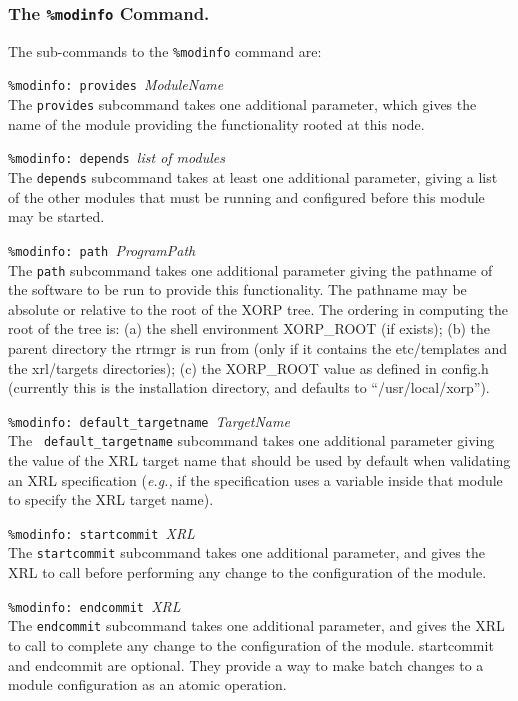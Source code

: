\documentclass[11pt]{article}
\newcommand{\eg}{\emph{e.g.,}\xspace}
\begin{document}
\subsubsection{The {\tt \%modinfo} Command.}
The sub-commands to the {\tt \%modinfo} command are:
\begin{description}
\item {{\tt \%modinfo: provides }{\it ModuleName}}  \\The {\tt provides} subcommand takes one additional
parameter, which gives the name of the module providing the
functionality rooted at this node.  

\item {{\tt \%modinfo: depends }{\it list of modules}}  \\The {\tt depends} subcommand takes at least one additional
parameter, giving a list of the other modules that must
be running and configured before this module may be started.

\item {{\tt \%modinfo: path }{\it ProgramPath}}  \\The {\tt path} subcommand takes one additional parameter giving the pathname of the software to be run
to provide this functionality.  The pathname may be absolute or
relative to the root of the XORP tree. The ordering in computing the root of
the tree is: (a) the shell environment XORP\_ROOT (if exists); (b) the parent
directory the rtrmgr is run from (only if it contains the
etc/templates and the xrl/targets directories); (c) the XORP\_ROOT value as
defined in config.h (currently this is the installation directory, and
defaults to ``/usr/local/xorp'').

\item {{\tt \%modinfo: default\_targetname }{\it TargetName}}  \\The {\tt
default\_targetname} subcommand takes one additional parameter giving the
value of the XRL target name that should be used by default when
validating an XRL specification (\eg if the specification uses a variable
inside that module to specify the XRL target name).

\item {{\tt \%modinfo: startcommit }{\it XRL}}  \\The {\tt startcommit} subcommand takes one additional
parameter, and gives the XRL to call before performing
any change to the configuration of the module.

\item {{\tt \%modinfo: endcommit }{\it XRL}}  \\The {\tt endcommit} subcommand takes one additional
parameter, and gives the XRL to call to complete any
change to the configuration of the module.  startcommit and
endcommit are optional.  They provide a way to make batch changes to a
module configuration as an atomic operation.


\end{description}
\end{document}
